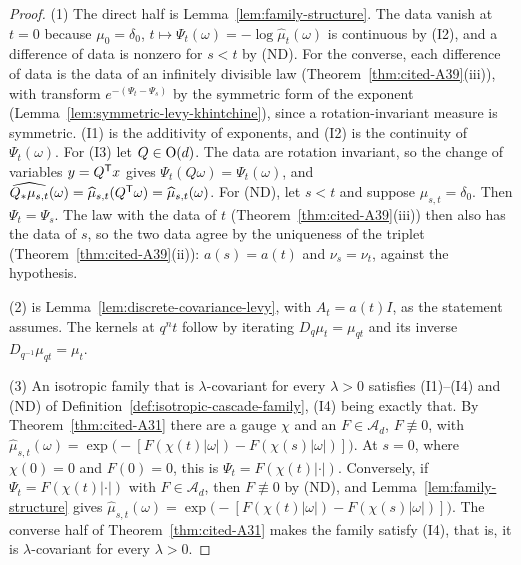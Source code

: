 \begin{proof}
\leanok
{}
(1) The direct half is Lemma~\ref{lem:family-structure}. The data vanish at $t = 0$ because
$\mu_0 = \delta_0$, $t \mapsto \Psi_t(\omega) = -\log\widehat\mu_t(\omega)$ is continuous by (I2),
and a difference of data is nonzero for $s < t$ by (ND). For the converse, each difference of data is
the data of an infinitely divisible law (Theorem~\ref{thm:cited-A39}(iii)), with transform
$e^{-(\Psi_t - \Psi_s)}$ by the symmetric form of the exponent (Lemma~\ref{lem:symmetric-levy-khintchine}), since a rotation-invariant measure is symmetric. (I1) is the
additivity of exponents, and (I2) is the continuity of $\Psi_t(\omega)$. For (I3) let
$Q \in \mathrm{O}(d)$. The data are rotation invariant, so the change of variables $y = Q^{\mathsf{T}}x$ gives
$\Psi_t(Q\omega) = \Psi_t(\omega)$, and $\widehat{Q_*\mu_{s,t}}(\omega) = \widehat\mu_{s,t}(Q^{\mathsf{T}}\omega)
= \widehat\mu_{s,t}(\omega)$. For (ND), let $s < t$ and suppose $\mu_{s,t} = \delta_0$. Then
$\Psi_t = \Psi_s$. The law with the data of $t$ (Theorem~\ref{thm:cited-A39}(iii)) then
also has the data of $s$, so the two data agree by the uniqueness of the triplet
(Theorem~\ref{thm:cited-A39}(ii)): $a(s) = a(t)$ and $\nu_s = \nu_t$, against the
hypothesis.

(2) is Lemma~\ref{lem:discrete-covariance-levy}, with $A_t = a(t)I$, as the statement assumes. The kernels at $q^nt$ follow by iterating $D_q\mu_t = \mu_{qt}$ and
its inverse $D_{q^{-1}}\mu_{qt} = \mu_t$.

(3) An isotropic family that is $\lambda$-covariant for every $\lambda > 0$ satisfies (I1)--(I4) and
(ND) of Definition~\ref{def:isotropic-cascade-family}, (I4) being exactly that. By
Theorem~\ref{thm:cited-A31} there are a gauge $\chi$ and an $F \in \mathcal{A}_d$,
$F \not\equiv 0$, with
$\widehat\mu_{s,t}(\omega) = \exp\bigl(-[F(\chi(t)|\omega|) - F(\chi(s)|\omega|)]\bigr)$. At $s = 0$,
where $\chi(0) = 0$ and $F(0) = 0$, this is $\Psi_t = F(\chi(t)|\cdot|)$. Conversely, if
$\Psi_t = F(\chi(t)|\cdot|)$ with $F \in \mathcal{A}_d$, then $F \not\equiv 0$ by (ND), and
Lemma~\ref{lem:family-structure} gives
$\widehat\mu_{s,t}(\omega) = \exp\bigl(-[F(\chi(t)|\omega|) - F(\chi(s)|\omega|)]\bigr)$. The converse
half of Theorem~\ref{thm:cited-A31} makes the family satisfy (I4), that is, it is
$\lambda$-covariant for every $\lambda > 0$.
\end{proof}

